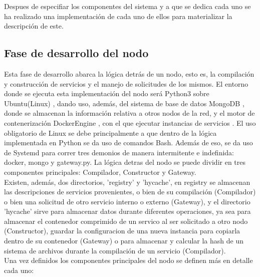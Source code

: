 \documentclass[11pt]{article}
\begin{document}
		Despues de especifiar los componentes del sistema y a que se dedica cada uno se ha realizado una implementación de cada uno de ellos para materializar la descripción de este. \\
		\subsection{Fase de desarrollo del nodo}
			Esta fase de desarrollo abarca la lógica detrás de un nodo, esto es, la compilación y construcción de servicios y el manejo de solicitudes de los mismos.
			El entorno donde se ejecuta esta implementación del nodo será Python3 sobre Ubuntu(Linux) \cite{python_doc}, dando uso, además, del sistema de base de datos MongoDB \cite{mongo}, donde se almacenan
			la información relativa a otros nodos de la red, y el motor de contenerización DockerEngine \cite{docker}, con el que ejecutar instancias de servicios \cite{brown_2018}.
			El uso obligatorio de Linux se debe principalmente a que dentro de la lógica implementada en Python se da uso de comandos Bash.
			Además de eso, se da uso de Systemd para correr tres demonios de manera intermitente e indefinida: docker, mongo y gateway.py. La lógica detras del nodo se puede dividir
			en tres componentes principales: Compilador, Constructor y Gateway. \\
			
			Existen, además, dos directorios, 'registry' y 'hycache', en registry se almacenan las descripciones de servicios provenientes, o bien de su compilación (Compilador) o bien una solicitud de 
			otro servicio interno o externo (Gateway), y el directorio 'hycache' sirve para almacenar datos durante diferentes operaciones, ya sea para almacenar el contenedor 
			comprimido de un servico al ser solicitado a otro nodo (Constructor), guardar la configuracion de una nueva instancia para copiarla dentro de su contenedor (Gateway)
			o para almacenar y calcular la hash de un sistema de archivos durante la compilación de un servicio (Compilador). \\

			Una vez definidos los componentes principales del nodo se definen más en detalle cada uno:
\end{document}
